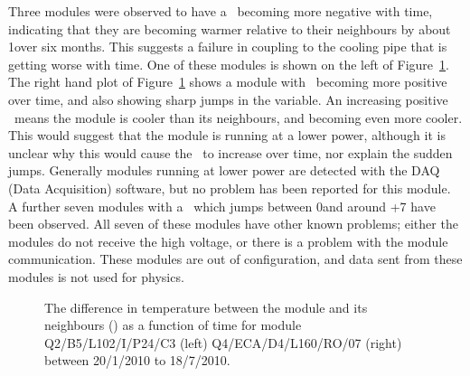 Three modules were observed to have a \tdiff\ becoming more negative with time,
indicating that they are becoming warmer relative to their neighbours by about
1\dc  over six months. This suggests a failure in coupling to the cooling pipe
that is getting worse with time. One of these modules is shown on the left of
Figure~\ref{fig:pm_ev_tdiff}.  The right hand plot of
Figure~\ref{fig:pm_ev_tdiff} shows a module with \tdiff\ becoming more positive
over time, and also showing sharp jumps in the variable. An increasing positive
\tdiff\ means the module is cooler than its neighbours, and becoming even more
cooler. This would suggest that the module is running at a lower power, although
it is unclear why this would cause the \tdiff\ to increase over time, nor explain
the sudden jumps. Generally modules running at lower power are detected with the
DAQ (Data Acquisition) software, but no problem has been reported for this
module. A further seven modules with a \tdiff\ which jumps between 0\dc and
around +7 \dc have been observed.  All seven of these modules have other known
problems; either the modules do not receive the high voltage, or there is a
problem with the module communication. These modules are out of configuration,
and data sent from these modules is not used for physics.

\begin{figure}[h]
 	\centering
	\caption{The difference in temperature between the module and its neighbours (\tdiff) as a function of time for module Q2/B5/L102/I/P24/C3 (left) Q4/ECA/D4/L160/RO/07 (right) between 20/1/2010 to 18/7/2010. }
	\label{fig:pm_ev_tdiff}
\end{figure}

